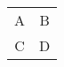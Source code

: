 \documentclass{article}
\begin{document}
\begin{tabular}{c c}
A & B \\
C & D
\end{tabular}
\end{document}
